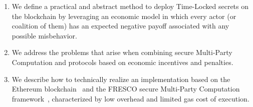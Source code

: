 \begin{enumerate}

	\smallskip
 	\item We define a practical and abstract method to deploy Time-Locked secrets on the blockchain by leveraging an economic model in which every actor (or coalition of them) has an expected negative payoff associated with any possible misbehavior.
 	
 	\smallskip
 	\item We address the problems that arise when combining secure Multi-Party Computation and protocols based on economic incentives and penalties. 
  
  	\smallskip
 	\item We describe how to technically realize an implementation based on the Ethereum blockchain~\cite{wood2014ethereum} and the FRESCO secure Multi-Party Computation framework~\cite{damgaard2016mpc}, characterized by low overhead and limited gas cost of execution.

\end{enumerate}


